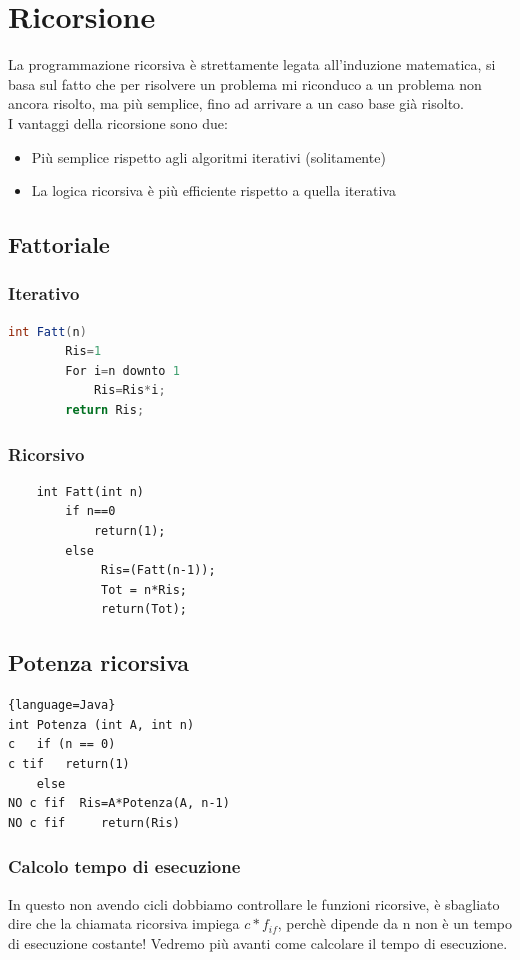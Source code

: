 \chapter{Ricorsione}
La programmazione ricorsiva è strettamente legata all'induzione matematica, si basa
sul fatto che per risolvere un problema mi riconduco a un problema non ancora risolto, 
ma più semplice, fino ad arrivare a un caso base già risolto.\\
I vantaggi della ricorsione sono due:
\begin{itemize}
    \item Più semplice rispetto agli algoritmi iterativi (solitamente)
    \item La logica ricorsiva è più efficiente rispetto a quella iterativa
\end{itemize}
\section{Fattoriale}
\subsection{Iterativo}
\begin{lstlisting}[language=Java]
    int Fatt(n)
        Ris=1
        For i=n downto 1
            Ris=Ris*i;
        return Ris;
\end{lstlisting}
\subsection{Ricorsivo}
\begin{lstlisting}
    int Fatt(int n)
        if n==0
            return(1);
        else
             Ris=(Fatt(n-1));
             Tot = n*Ris;
             return(Tot);
\end{lstlisting}
\section{Potenza ricorsiva}
\begin{lstlisting}{language=Java}
int Potenza (int A, int n)
c   if (n == 0)
c tif   return(1)
    else
NO c fif  Ris=A*Potenza(A, n-1)
NO c fif     return(Ris)
\end{lstlisting}
\subsection{Calcolo tempo di esecuzione}
In questo non avendo cicli dobbiamo controllare le funzioni ricorsive, è sbagliato
dire che la chiamata ricorsiva impiega $c*f_{if}$, perchè dipende da n non è un tempo
di esecuzione costante! Vedremo più avanti come calcolare il tempo di esecuzione.
